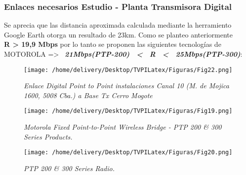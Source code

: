 \documentclass[a4paper,11pt]{article} %
\begin{document}
\newpage
\begin{center}
\color{white}{.}
\end{center}
\newpage
\begin{center}
\color{white}{.}
\end{center}
\newpage
\begin{center}
\color{white}{.}
\end{center}
\newpage
\begin{center}
\color{white}{.}
\end{center}
\newpage
\begin{center}
\color{white}{.}
\end{center}
\newpage
\begin{center}
\color{white}{.}
\end{center}
\newpage

\subsubsection{Enlaces necesarios Estudio - Planta Transmisora
Digital}

Se aprecia que las distancia aproximada calculada mediante la
herramiento Google Earth otorga un resultado de 23km. Como se
planteo anteriormente \\ \textbf{R > 19,9 Mbps} por lo tanto se proponen
las siguientes tecnolog\'ias de \\ MOTOROLA => \
\textbf{\emph{21Mbps(PTP-200) \ < \ R \ < \ 25Mbps(PTP-300)}}: 

\begin{figure}[h!] 
\centering
\texttt{[image: /home/delivery/Desktop/TVPILatex/Figuras/Fig22.png]}
\caption{\emph{Enlace Digital Point to Point instalaciones Canal 10
(M. de Mojica 1600, 5008 Cba.) a Base Tx Cerro Mogote}}
\end{figure}

\begin{figure}[h!] 
\centering
\texttt{[image: /home/delivery/Desktop/TVPILatex/Figuras/Fig19.png]}
\caption{\emph{Motorola Fixed Point-to-Point Wireless Bridge - PTP 200
\& 300 Series Products.}}
\end{figure}

\begin{figure}[h!] 
\centering
\texttt{[image: /home/delivery/Desktop/TVPILatex/Figuras/Fig20.png]}
\caption{\emph{PTP 200 \& 300 Series Radio.}}
\end{figure}
\end{document}

